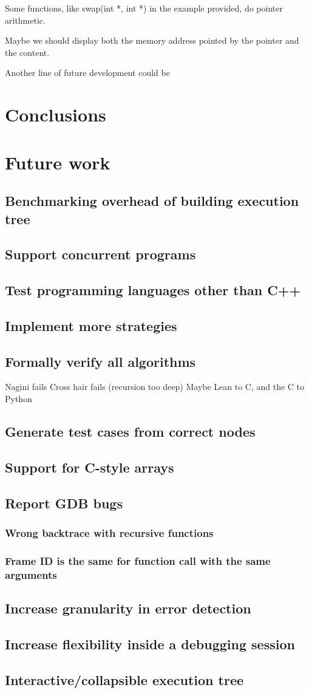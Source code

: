 Some functions, like swap(int *, int *) in the example provided, do pointer arithmetic.

Maybe we should display both the memory address pointed by the pointer and the content.

Another line of future development could be 

\section{Conclusions}
\section{Future work}
\subsection{Benchmarking overhead of building execution tree}
\subsection{Support concurrent programs}
\subsection{Test programming languages other than C++}
\subsection{Implement more strategies}
\subsection{Formally verify all algorithms}
Nagini fails
Cross hair fails (recursion too deep)
Maybe Lean to C, and the C to Python
\subsection{Generate test cases from correct nodes}
\subsection{Support for C-style arrays}
\subsection{Report GDB bugs}
\subsubsection{Wrong backtrace with recursive functions}
\subsubsection{Frame ID is the same for function call with the same arguments}
\subsection{Increase granularity in error detection}
\subsection{Increase flexibility inside a debugging session}
\subsection{Interactive/collapsible execution tree}